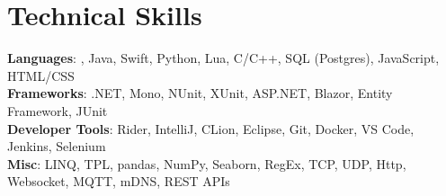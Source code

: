 \section{Technical Skills}
 \begin{itemize}[leftmargin=0.15in, label={}]
    \small{\item{

    
     \textbf{Languages}{: \csharp, Java, Swift, Python, Lua, C/C++, SQL (Postgres), JavaScript, HTML/CSS} \\

     
     \textbf{Frameworks}{: .NET, Mono, NUnit, XUnit, ASP.NET, Blazor, Entity Framework, JUnit} \\

     
     \textbf{Developer Tools}{: Rider, IntelliJ, CLion, Eclipse, Git, Docker, VS Code,  Jenkins, Selenium} \\

     
     \textbf{Misc}{: LINQ, TPL, pandas, NumPy, Seaborn, RegEx, TCP, UDP, Http, Websocket, MQTT, mDNS, REST APIs}
    }}
\end{itemize}